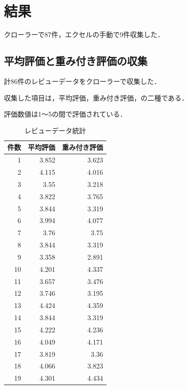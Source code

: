 \chapter{結果}

クローラーで87件，エクセルの手動で9件収集した．

\section{平均評価と重み付き評価の収集}



計86件のレビューデータをクローラーで収集した．

収集した項目は，平均評価，重み付き評価，の二種である．

評価数値は1～5の間で評価されている．




\begin{table}[htb]
\label{reviewtoukei}
  \begin{center}
    \caption{レビューデータ統計}


\begin{tabular}{|r|r|r|}

\hline
件数 & 平均評価 & 重み付き評価 \\
\hline\hline

1 &3.852 &3.623\\
2 &4.115 &4.016\\
3 &3.55 &3.218\\
4 &3.822 &3.765\\
5 &3.844 &3.319\\
6 &3.994 &4.077\\
7 &3.76 &3.75\\
8 &3.844 &3.319\\
9 &3.358 &2.891\\
10 &4.201 &4.337\\
11 &3.657 &3.476\\
12 &3.746 &3.195\\
13 &4.424 &4.359\\
14 &3.844 &3.319\\
15 &4.222 &4.236\\
16 &4.049 &4.171\\
17 &3.819 &3.36\\
18 &4.066 &3.823\\
19 &4.301 &4.434\\

	\hline
    \end{tabular}
  \end{center}
\end{table}



